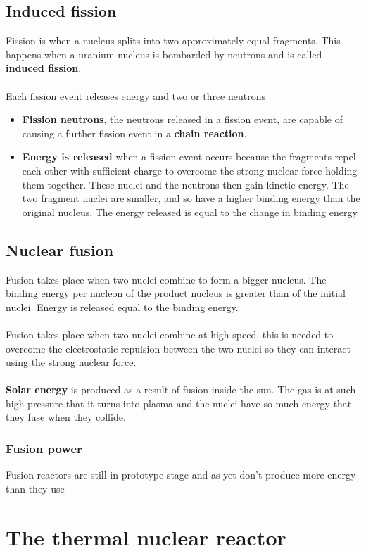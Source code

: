 \documentclass{article}[18pt]
\begin{document}
\subsection{Induced fission}
Fission is when a nucleus splits into two approximately equal fragments. This happens when a uranium nucleus is bombarded by neutrons and is called \textbf{induced fission}.\\
\\
Each fission event releases energy and two or three neutrons
\begin{itemize}
\item \textbf{Fission neutrons}, the neutrons released in a fission event, are capable of causing a further fission event in a \textbf{chain reaction}.
\item \textbf{Energy is released} when a fission event occurs because the fragments repel each other with sufficient charge to overcome the strong nuclear force holding them together. These nuclei and the neutrons then gain kinetic energy. The two fragment nuclei are smaller, and so have a higher binding energy than the original nucleus. The energy released is equal to the change in binding energy
\end{itemize}
\subsection{Nuclear fusion}
Fusion takes place when two nuclei combine to form a bigger nucleus. The binding energy per nucleon of the product nucleus is greater than of the initial nuclei. Energy is released equal to the binding energy.\\
\\
Fusion takes place when two nuclei combine at high speed, this is needed to overcome the electrostatic repulsion between the two nuclei so they can interact using the strong nuclear force.\\
\\
\textbf{Solar energy} is produced as a result of fusion inside the sun. The gas is at such high pressure that it turns into plasma and the nuclei have so much energy that they fuse when they collide.
\subsubsection{Fusion power}
Fusion reactors are still in prototype stage and as yet don't produce more energy than they use
\section{The thermal nuclear reactor}
\end{document}
